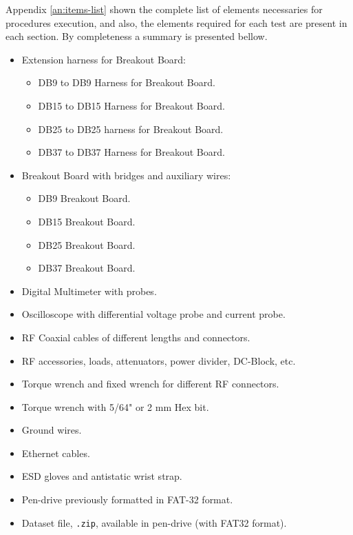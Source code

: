 Appendix \ref{an:items-list} shown the complete list of elements necessaries for procedures execution, and also, the elements required for each test are present in each section. By completeness a summary is presented bellow. 
\begin{itemize}
\item Extension harness for Breakout Board:
	\begin{itemize}
		\item DB9 to DB9 Harness for Breakout Board.
		\item DB15 to DB15 Harness for Breakout Board.
		\item DB25 to DB25 harness for Breakout Board.
		\item DB37 to DB37 Harness for Breakout Board.
	\end{itemize}
	\item Breakout Board with bridges and auxiliary wires:
	\begin{itemize}
		\item DB9 Breakout Board.
		\item DB15 Breakout Board.
		\item DB25 Breakout Board.
		\item DB37 Breakout Board.
	\end{itemize}
\item Digital Multimeter with probes.
\item Oscilloscope with differential voltage probe and current probe.
\item RF Coaxial cables of different lengths and connectors.
\item RF accessories, loads, attenuators, power divider, DC-Block, etc.
\item Torque wrench and fixed wrench for different RF connectors.
\item Torque wrench with 5/64" or 2 mm Hex bit.
\item Ground wires.
\item Ethernet cables.
\item ESD gloves and antistatic wrist strap.
\item Pen-drive previously formatted in FAT-32 format.
\item Dataset file, \texttt{\datasetNameone}
\texttt{\datasetNametwo.zip}, available in pen-drive (with FAT32 format).

\end{itemize}

